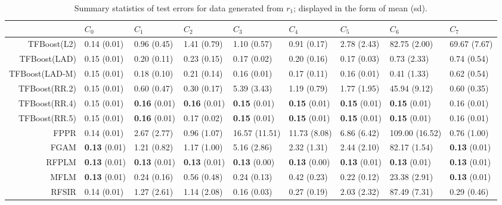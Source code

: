 \begin{table}[H]
\centering
\begin{tabular}{rllllllll}
  \hline
 & $C_0$ & $C_1$ & $C_2$ & $C_3$ & $C_4$ & $C_5$ & $C_6$ & $C_7$ \\ 
  \hline
TFBoost(L2) & 0.14 (0.01) & 0.96 (0.45) & 1.41 (0.79) & 1.10 (0.57) & 0.91 (0.17) & 2.78 (2.43) & 82.75 (2.00) & 69.67 (7.67) \\ 
  TFBoost(LAD) & 0.15 (0.01) & 0.20 (0.11) & 0.23 (0.15) & 0.17 (0.02) & 0.20 (0.16) & 0.17 (0.03) & 0.73 (2.33) & 0.74 (0.54) \\ 
  TFBoost(LAD-M) & 0.15 (0.01) & 0.18 (0.10) & 0.21 (0.14) & 0.16 (0.01) & 0.17 (0.11) & 0.16 (0.01) & 0.41 (1.33) & 0.62 (0.54) \\ 
  TFBoost(RR.2) & 0.15 (0.01) & 0.60 (0.47) & 0.30 (0.17) & 5.39 (3.43) & 1.19 (0.79) & 1.77 (1.95) & 45.94 (9.12) & 0.60 (0.35) \\ 
  TFBoost(RR.4) & 0.15 (0.01) & \textbf{0.16} (0.01) & \textbf{0.16} (0.01) & \textbf{0.15} (0.01) & \textbf{0.15} (0.01) & \textbf{0.15} (0.01) & \textbf{0.15} (0.01) & 0.16 (0.01) \\ 
  TFBoost(RR.5) & 0.15 (0.01) & \textbf{0.16} (0.01) & 0.17 (0.02) & \textbf{0.15} (0.01) & \textbf{0.15} (0.01) & \textbf{0.15} (0.01) & \textbf{0.15} (0.01) & 0.16 (0.01) \\ 
  FPPR & 0.14 (0.01) & 2.67 (2.77) & 0.96 (1.07) & 16.57 (11.51) & 11.73 (8.08) & 6.86 (6.42) & 109.00 (16.52) & 0.76 (1.00) \\ 
  FGAM & \textbf{0.13} (0.01) & 1.21 (0.82) & 1.17 (1.00) & 5.16 (2.86) & 2.32 (1.31) & 2.44 (2.10) & 82.17 (1.54) & \textbf{0.13} (0.01) \\ 
  RFPLM & \textbf{0.13} (0.01) & \textbf{0.13} (0.01) & \textbf{0.13} (0.01) & \textbf{0.13} (0.00) & \textbf{0.13} (0.00) & \textbf{0.13} (0.01) & \textbf{0.13} (0.01) & \textbf{0.13} (0.01) \\ 
  MFLM & \textbf{0.13} (0.01) & 0.24 (0.16) & 0.56 (0.48) & 0.24 (0.13) & 0.42 (0.23) & 0.22 (0.12) & 23.38 (2.91) & \textbf{0.13} (0.01) \\ 
  RFSIR & 0.14 (0.01) & 1.27 (2.61) & 1.14 (2.08) & 0.16 (0.03) & 0.27 (0.19) & 2.03 (2.32) & 87.49 (7.31) & 0.29 (0.46) \\ 
   \hline
\end{tabular}
\caption{Summary statistics of test errors for data generated from $r_1$; displayed in the form of mean (sd).} 
\end{table}
